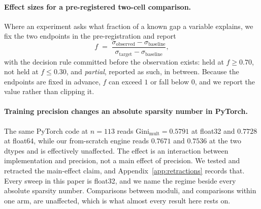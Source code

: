 \paragraph{Effect sizes for a pre-registered two-cell comparison.} Where an experiment asks
what fraction of a known gap a variable explains, we fix the two endpoints in the
pre-registration and report
\begin{equation}
  \label{eq:effectsize}
  f \;=\; \frac{\sigma_{\text{observed}} - \sigma_{\text{baseline}}}
                {\sigma_{\text{target}} - \sigma_{\text{baseline}}},
\end{equation}
with the decision rule committed before the observation exists: held at $f \ge 0.70$, not
held at $f \le 0.30$, and \emph{partial}, reported as such, in between.
Because the endpoints are fixed in advance, $f$ can exceed $1$ or fall below $0$, and we
report the value rather than clipping it.

\paragraph{Training precision changes an absolute sparsity number in PyTorch.} The same
PyTorch code at $n = 113$ reads $\mathrm{Gini}_{\text{mult}} = 0.5791$ at float32 and $0.7728$
at float64, while our from-scratch engine reads $0.7671$ and $0.7536$ at the two dtypes and is
effectively unaffected. The effect is an interaction between implementation and precision, not
a main effect of precision. We tested and retracted the main-effect claim, and
Appendix~\ref{app:retractions} records that. Every sweep in this paper is float32, and we
name the regime beside every absolute sparsity number. Comparisons between moduli, and
comparisons within one arm, are unaffected, which is what almost every result here rests on.
